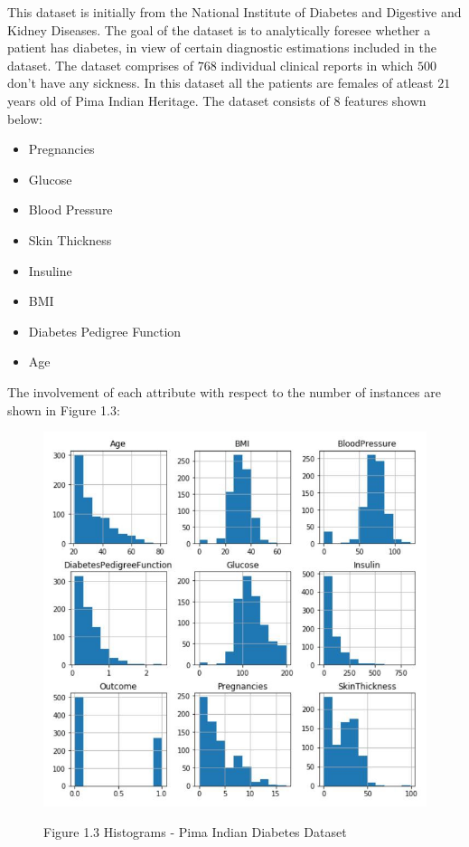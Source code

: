 \documentclass[oneside,12pt]{Classes/VTU}
\begin{document}
	This dataset is initially from the National Institute of Diabetes and Digestive and Kidney Diseases. The goal of the dataset is to analytically foresee whether a patient has diabetes, in view of certain diagnostic estimations included in the dataset. The dataset comprises of $768$ individual clinical reports in which $500$ don't have any sickness. In this dataset all the patients are females of atleast $21$ years old of Pima Indian Heritage. 
	The dataset consists of $8$ features shown below:
	\begin{itemize}
		\item Pregnancies
		\item Glucose
		\item Blood Pressure 
		\item Skin Thickness
		\item Insuline
		\item BMI
		\item Diabetes Pedigree Function
		\item Age
	\end{itemize}
	The involvement of each attribute with respect to the number of instances are shown in Figure 1.3:
	\linebreak
	\begin{figure}	
		\begin{center}
			\includegraphics[scale=0.6]{images/diabeteshistogram.jpeg}
		\end{center}
	
		\begin{center}
			Figure 1.3 Histograms - Pima Indian Diabetes Dataset
		\end{center}
	\end{figure}
\end{document}
